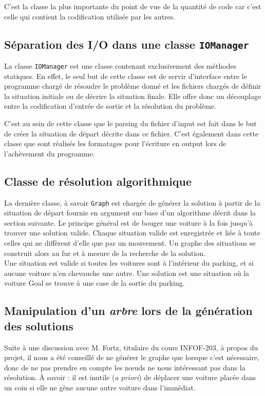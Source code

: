 \documentclass{article}
\begin{document}
		C'est la classe la plus importante du point de vue de la quantité de code car c'est celle qui contient la codification utilisée par les autres.

	\subsection{Séparation des I/O dans une classe \texttt{IOManager}}
		La classe \texttt{IOManager} est une classe contenant exclusivement des méthodes statiques. En effet, le seul but de cette classe
		est de servir d'interface entre le programme chargé de résoudre le problème donné et les fichiers chargés de définir la situation
		initiale ou de décrire la situation finale. Elle offre donc un découplage entre la codification d'entrée de sortie et la résolution
		du problème.

		C'est au sein de cette classe que le parsing du fichier d'input est fait dans le but de créer la situation de départ décrite dans ce fichier.
		C'est également dans cette classe que sont réalisés les formatages pour l'écriture en output lors de l'achèvement du programme.

	\subsection{Classe de résolution algorithmique}
		La dernière classe, à savoir \texttt{Graph} est chargée de générer la solution à partir de la situation de départ fournie en argument
		sur base d'un algorithme décrit dans la section suivante. Le principe général est de bouger une voiture à la fois jusqu'à trouver une
		solution valide. Chaque situation valide est enregistrée et liée à toute celles qui ne diffèrent d'elle que par un mouvement.
		Un graphe des situations se construit alors au fur et à mesure de la recherche de la solution.\\
		Une situation est valide si toutes les voitures sont à l'intérieur du parking, et si aucune voiture n'en chevauche une autre.
		Une solution est une situation où la voiture Goal se trouve à une case de la sortie du parking.

	\subsection{Manipulation d'un \textit{arbre} lors de la génération des solutions}
		Suite à une discussion avec M. Fortz, titulaire du cours INFOF-203, à propos du projet, il nous a été conseillé de ne générer le graphe
		que lorsque c'est nécessaire, donc de ne pas prendre en compte les nœuds ne nous intéressant pas dans la résolution. À savoir : il est
		inutile (\textit{a priori}) de déplacer une voiture placée dans un coin si elle ne gène aucune autre voiture dans l'immédiat.
\end{document}

